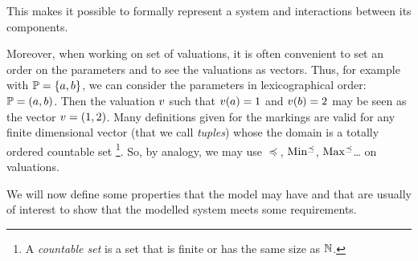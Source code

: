 This makes it possible to formally represent a system and interactions between its components.

Moreover, when working on set of valuations, it is often convenient to set an order on the parameters and to see the valuations as vectors.
Thus, for example with $\mathbb{P} = \{a, b\}$, we can consider the parameters in lexicographical order: $\mathbb{P} = (a, b)$.
Then the valuation $\val$ such that $\val(a) = 1$ and $\val(b) = 2$ may be seen as the vector $\val = (1,2)$.
Many definitions given for the markings are valid for any finite dimensional vector (that we call \emph{tuples}) whose the domain is a totally ordered countable set%
\footnote{A \emph{countable set} is a set that is finite or has the same size as $\mathbb{N}$.}.
So, by analogy, we may use $\preceq$, $\operatorname{Min^\preceq}$, $\operatorname{Max^\preceq}$… on valuations.

We will now define some properties that the model may have and that are usually of interest to show that the modelled system meets some requirements.
